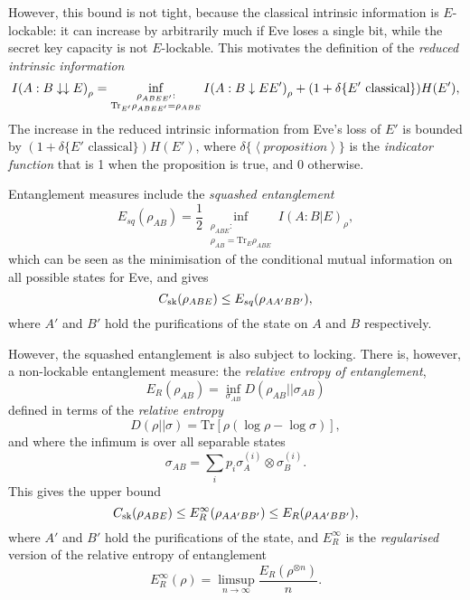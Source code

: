 \documentclass[10pt, a4paper]{article}
\numberwithin{equation}{section} %
\theoremstyle{definition}
\theoremstyle{plain}
\newcommand{\?}{\mathrel{?}} %
\newcommand{\angleb}[1]{\left\langle #1 \right\rangle} %
\newcommand{\Tr}{\mathrm{Tr}} %
\newcommand{\sk}{\rm sk}
\begin{document}
      However, this bound is not tight, because the classical intrinsic information is \(E\)-lockable: it can increase by arbitrarily much if Eve loses a single bit, while the secret key capacity is not \(E\)-lockable. This motivates the definition of the \emph{reduced intrinsic information}
      \begin{equation}
        I{(A : B \downarrow\downarrow E)}_{\rho} = \inf_{%
        \substack{\rho_{A B EE'} : \\ 
        \Tr_{E'} \rho_{A B EE'} = \rho_{A B E}}}
        I{(A : B \downarrow EE')}_{\rho} + (1+\delta\{E' \text{ classical}\})H(E'),
      \end{equation}
      The increase in the reduced intrinsic information from Eve's loss of \(E'\) is bounded by \((1+\delta\{E' \text{ classical}\})H(E')\), where \(\delta\{\angleb{proposition}\}\) is the \emph{indicator function} that is 1 when the proposition is true, and 0 otherwise.

      Entanglement measures include the \emph{squashed entanglement}
      \begin{equation}
        E_{sq}(\rho_{A B}) = \frac{1}{2} \inf_{\substack{\rho_{A BE} : \\ \rho_{A B} = \Tr_E \rho_{A BE}}} I(A:B|E)_{\rho},
      \end{equation}
      which can be seen as the minimisation of the conditional mutual information on all possible states for Eve, and gives
      \begin{equation}
        C_{\sk}(\rho_{A B E}) \leq E_{sq}(\rho_{A A' B B'}),
      \end{equation}
      where \(A'\) and \(B'\) hold the purifications of the state on \(A\) and \(B\) respectively.

      However, the squashed entanglement is also subject to locking. There is, however, a non-lockable entanglement measure: the \emph{relative entropy of entanglement},  
      \begin{equation}
        E_R\left({\rho_{AB}}\right) = \inf_{\sigma_{AB}} D(\rho_{AB}||\sigma_{AB})
      \end{equation}
      defined in terms of the \emph{relative entropy}
      \begin{equation}
        D(\rho||\sigma) = \Tr\left[ \rho (\log \rho - \log \sigma) \right],
      \end{equation}
      and where the infimum is over all separable states
      \begin{equation}
        \sigma_{AB} = \sum_i p_i \sigma_{A}^{(i)} \otimes \sigma_{B}^{(i)}.
      \end{equation}
      This gives the upper bound
      \begin{equation}
        C_{\sk}(\rho_{A B E}) \leq E_{R}^{\infty}(\rho_{A A' B B'}) \leq E_{R}(\rho_{A A' B B'}),
      \end{equation}
      where \(A'\) and \(B'\) hold the purifications of the state, and \(E_{R}^{\infty}\) is the \emph{regularised} version of the relative entropy of entanglement
      \begin{equation}
        E_{R}^{\infty}(\rho) = \limsup_{n\to\infty} \frac{E_R(\rho^{\otimes n})}{n}.
      \end{equation}
\end{document}
